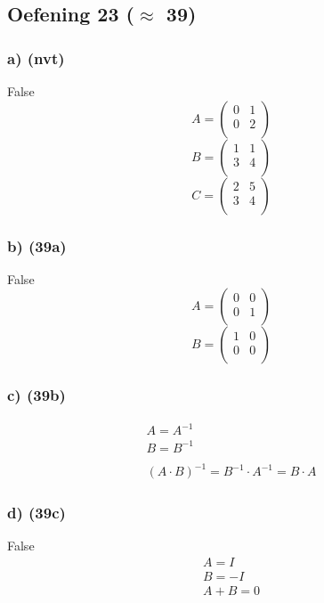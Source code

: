 \documentclass[lineaire_algebra_oplossingen.tex]{subfiles}
\begin{document}
\subsection{Oefening 23 ($\approx$ 39)}
\subsubsection*{a) (nvt)}
False
\[
A=\left(\begin{array}{cc}
    0 & 1\\
    0 & 2\\
\end{array} \right)
\]
\[
B=\left(\begin{array}{cc}
    1 & 1\\
    3 & 4\\
\end{array} \right)
\]
\[
C=\left(\begin{array}{cc}
    2 & 5\\
    3 & 4\\
\end{array} \right)
\]
\subsubsection*{b) (39a)}
 False
\[
A=\left(\begin{array}{cc}
    0 & 0\\
    0 & 1\\
\end{array} \right)
\]
\[
B=\left(\begin{array}{cc}
    1 & 0\\
    0 & 0\\
\end{array} \right)
\]
\subsubsection*{c) (39b)}
\begin{gather*}
A=A^{-1}\\
B=B^{-1}\\
\\
(A \cdot B)^{-1}=B^{-1} \cdot A^{-1}=B \cdot A
\end{gather*}

\subsubsection*{d) (39c)}
False
\begin{gather*}
A=I\\
B=-I\\
A+B=0
\end{gather*}
\end{document}
